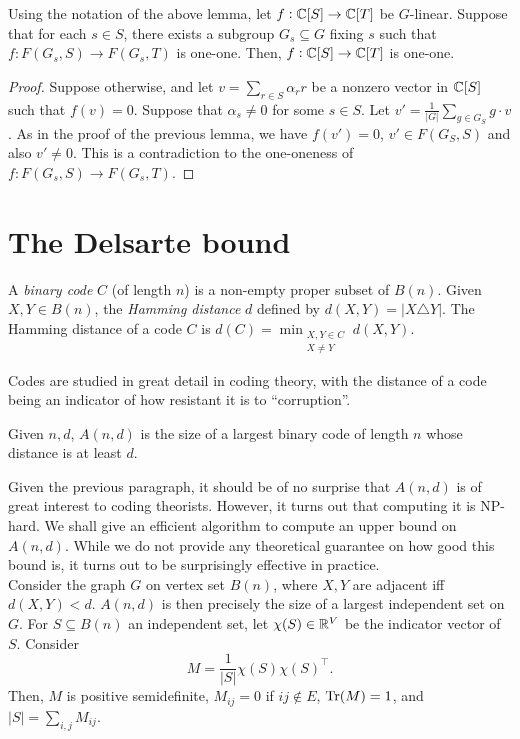 	\begin{fcor}
		\label{cor:glinear-11}
		Using the notation of the above lemma, let $f : \mathbb{C}[S] \to \mathbb{C}[T]$ be $G$-linear. Suppose that for each $s \in S$, there exists a subgroup $G_s \subseteq G$ fixing $s$ such that $f : F(G_s,S) \to F(G_s,T)$ is one-one. Then, $f : \mathbb{C}[S] \to \mathbb{C}[T]$ is one-one.
	\end{fcor}
	\begin{proof}
		Suppose otherwise, and let $v = \sum_{r \in S} \alpha_r r$ be a nonzero vector in $\mathbb{C}[S]$ such that $f(v) = 0$. Suppose that $\alpha_s \ne 0$ for some $s \in S$. Let $v' = \frac{1}{|G|} \sum_{g \in G_S} g \cdot v$. As in the proof of the previous lemma, we have $f(v') = 0$, $v' \in F(G_S,S)$ and also $v' \ne 0$. This is a contradiction to the one-oneness of $f : F(G_s,S) \to F(G_s,T)$.
	\end{proof}

\section{The Delsarte bound}
\label{subsec:delsarte}

	\begin{fdef}
		A \emph{binary code} $C$ (of length $n$) is a non-empty proper subset of $B(n)$. Given $X,Y \in B(n)$, the \emph{Hamming distance} $d$ defined by $d(X,Y) = |X \triangle Y|$. The Hamming distance of a code $C$ is $d(C) = \min_{\substack{X,Y \in C \\ X \ne Y}} d(X,Y)$.
	\end{fdef}

	Codes are studied in great detail in coding theory, with the distance of a code being an indicator of how resistant it is to ``corruption''.

	\begin{fdef}
		Given $n,d$, $A(n,d)$ is the size of a largest binary code of length $n$ whose distance is at least $d$.
	\end{fdef}

	Given the previous paragraph, it should be of no surprise that $A(n,d)$ is of great interest to coding theorists. However, it turns out that computing it is \textsf{NP}-hard. We shall give an efficient algorithm to compute an upper bound on $A(n,d)$. While we do not provide any theoretical guarantee on how good this bound is, it turns out to be surprisingly effective in practice.\\

	Consider the graph $G$ on vertex set $B(n)$, where $X,Y$ are adjacent iff $d(X,Y) < d$. $A(n,d)$ is then precisely the size of a largest independent set on $G$. For $S \subseteq B(n)$ an independent set, let $\chi(S) \in \mathbb{R}^V$ be the indicator vector of $S$. Consider
	\[ M = \frac{1}{|S|} \chi(S) \chi(S)^\top. \]
	Then, $M$ is positive semidefinite, $M_{ij} = 0$ if $ij \not\in E$, $\operatorname{Tr}(M) = 1$, and $|S| = \sum_{i,j} M_{ij}$.

